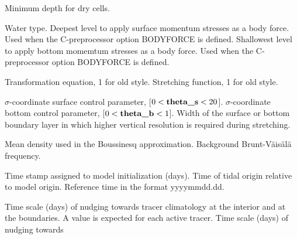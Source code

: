 \begin{klist}
\begin{klist}
     \end{klist}
     \begin{klist}
         Minimum depth for dry cells.
     \end{klist}
     \begin{klist}
         Water type.
         Deepest level to apply surface momentum
     stresses as a body force.
            Used when the C-preprocessor option BODYFORCE is defined.
         Shallowest level to apply bottom momemtum
    stresses as a body force.
            Used when the C-preprocessor option BODYFORCE is defined.
     \end{klist}
     \begin{klist}
        Transformation equation, 1 for old style.
        Stretching function, 1 for old style.
     \end{klist}
     \begin{klist}
         $\sigma$-coordinate surface control parameter,
     [$0 < \mbox{\bf theta\_s} < 20$].
         $\sigma$-coordinate bottom  control parameter,
     [$0 < \mbox{\bf theta\_b} < 1$].
          Width of the surface or bottom boundary layer
     in which higher vertical resolution is required during stretching.
     \end{klist}
     \begin{klist}
            Mean density used in the Boussinesq
     approximation.
        Background Brunt-V\"ais\"al\"a frequency.
     \end{klist}
     \begin{klist}
          Time stamp assigned to model initialization
     (days).
          Time of tidal origin relative to model
       origin.
         Reference time in the format yyyymmdd.dd.
     \end{klist}
     \begin{klist}
           Time scale (days) of nudging towards
     tracer climatology at the interior and at the boundaries.
     A value is expected for each active tracer.
           Time scale (days) of nudging towards

\end{klist}
\end{klist}
